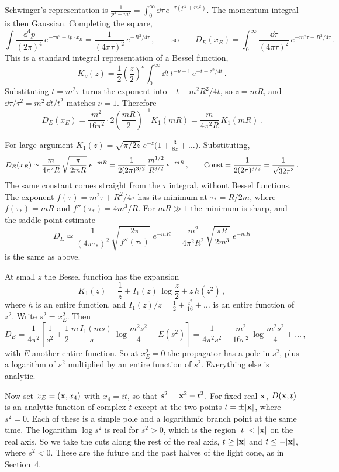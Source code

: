  Schwinger's representation is
$\frac1{p^2+m^2}=\int_0^\infty \dd\tau\,e^{-\tau(p^2+m^2)}$. The momentum integral is
then Gaussian. Completing the square,
\[
\int\frac{\dd^4p}{(2\pi)^4}\,e^{-\tau p^2+ip\cdot x_E}=\frac1{(4\pi\tau)^2}\,e^{-R^2/4\tau}\,,
\qquad\text{so}\qquad
D_E(x_E)=\int_0^\infty\frac{\dd\tau}{(4\pi\tau)^2}\,e^{-m^2\tau-R^2/4\tau}\,.
\]
This is a standard integral representation of a Bessel function,
\[
K_\nu(z)=\frac12\left(\frac z2\right)^\nu\int_0^\infty \dd t\,t^{-\nu-1}\,e^{-t-z^2/4t}\,.
\]
Substituting $t=m^2\tau$ turns the exponent into $-t-m^2R^2/4t$, so $z=mR$, and
$\dd\tau/\tau^2=m^2\,\dd t/t^2$ matches $\nu=1$. Therefore
\[
D_E(x_E)=\frac{m^2}{16\pi^2}\cdot2\left(\frac{mR}2\right)^{-1}K_1(mR)=\frac m{4\pi^2R}\,K_1(mR)\,.
\]

 For large argument
$K_1(z)=\sqrt{\pi/2z}\;e^{-z}\bigl(1+\frac3{8z}+\dots\bigr)$. Substituting,
\[
D_E(x_E)\simeq\frac m{4\pi^2R}\,\sqrt{\frac\pi{2mR}}\;e^{-mR}
=\frac1{2(2\pi)^{3/2}}\,\frac{m^{1/2}}{R^{3/2}}\,e^{-mR}\,,\qquad
\text{Const}=\frac1{2(2\pi)^{3/2}}=\frac1{\sqrt{32\pi^3}}\,.
\]
The same constant comes straight from the $\tau$ integral, without Bessel
functions. The exponent $f(\tau)=m^2\tau+R^2/4\tau$ has its minimum at
$\tau_*=R/2m$, where $f(\tau_*)=mR$ and $f''(\tau_*)=4m^3/R$. For $mR\gg1$ the
minimum is sharp, and the saddle point estimate
\[
D_E\simeq\frac1{(4\pi\tau_*)^2}\,\sqrt{\frac{2\pi}{f''(\tau_*)}}\;e^{-mR}
=\frac{m^2}{4\pi^2R^2}\,\sqrt{\frac{\pi R}{2m^3}}\;e^{-mR}
\]
is the same as above.

 At small $z$ the Bessel function has the expansion
\[
K_1(z)=\frac1z+I_1(z)\,\log\frac z2+z\,h(z^2)\,,
\]
where $h$ is an entire function, and $I_1(z)/z=\frac12+\frac{z^2}{16}+\dots$ is an
entire function of $z^2$. Write $s^2=x_E^2$. Then
\[
D_E=\frac1{4\pi^2}\left[\frac1{s^2}+\frac12\,\frac{m\,I_1(ms)}s\,\log\frac{m^2s^2}4+E(s^2)\right]
=\frac1{4\pi^2s^2}+\frac{m^2}{16\pi^2}\,\log\frac{m^2s^2}4+\dots\,,
\]
with $E$ another entire function. So at $x_E^2=0$ the propagator has a pole in
$s^2$, plus a logarithm of $s^2$ multiplied by an entire function of $s^2$.
Everything else is analytic.

Now set $x_E=(\mathbf{x},x_4)$ with $x_4=it$, so that $s^2=\mathbf{x}^2-t^2$. For fixed real
$\mathbf{x}$, $D(\mathbf{x},t)$ is an analytic function of complex $t$ except at the two
points $t=\pm|\mathbf{x}|$, where $s^2=0$. Each of these is a simple pole and a
logarithmic branch point at the same time. The logarithm $\log s^2$ is real for
$s^2>0$, which is the region $|t|<|\xx|$ on the real axis. So we take the cuts
along the rest of the real axis, $t\ge|\mathbf{x}|$ and $t\le-|\mathbf{x}|$, where $s^2<0$.
These are the future and the past halves of the light cone, as in Section~4.

